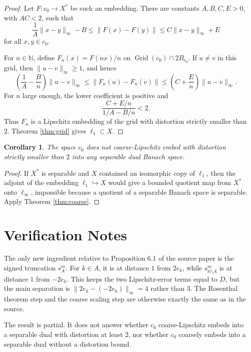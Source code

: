 \documentclass[11pt]{article}
\newtheorem{corollary}{Corollary}
\newcommand{\N}{\mathbb N}
\newcommand{\Grid}{\operatorname{Grid}}
\begin{document}
\begin{proof}
Let \(F:c_0\to X^*\) be such an embedding.  There are constants
\(A,B,C,E>0\), with \(AC<2\), such that
\[
  \frac1A\|x-y\|_\infty-B
  \le \|F(x)-F(y)\|
  \le C\|x-y\|_\infty+E
\]
for all \(x,y\in c_0\).

For \(n\in\N\), define \(F_n(x)=F(nx)/n\) on
\(\Grid(c_0)\cap 2B_{c_0}\).  If \(u\ne v\) in this grid, then
\(\|u-v\|_\infty\ge 1\), and hence
\[
  \left(\frac1A-\frac{B}{n}\right)\|u-v\|_\infty
  \le \|F_n(u)-F_n(v)\|
  \le \left(C+\frac{E}{n}\right)\|u-v\|_\infty .
\]
For \(n\) large enough, the lower coefficient is positive and
\[
  \frac{C+E/n}{1/A-B/n}<2.
\]
Thus \(F_n\) is a Lipschitz embedding of the grid with distortion strictly
smaller than \(2\).  Theorem \ref{thm:grid} gives \(\ell_1\subset X\).
\end{proof}

\begin{corollary}
The space \(c_0\) does not coarse-Lipschitz embed with distortion strictly
smaller than \(2\) into any separable dual Banach space.
\end{corollary}

\begin{proof}
If \(X^*\) is separable and \(X\) contained an isomorphic copy of \(\ell_1\),
then the adjoint of the embedding \(\ell_1\hookrightarrow X\) would give a
bounded quotient map from \(X^*\) onto \(\ell_\infty\), impossible because a
quotient of a separable Banach space is separable.  Apply Theorem
\ref{thm:coarse}.
\end{proof}

\section*{Verification Notes}

The only new ingredient relative to Proposition 6.1 of the source paper is
the signed truncation \(s_A^m\).  For \(k\in A\), it is at distance \(1\) from
\(2e_k\), while \(s_{\N\setminus A}^m\) is at distance \(1\) from \(-2e_k\).
This keeps the two Lipschitz-error terms equal to \(D\), but the main
separation is \(\|2e_k-(-2e_k)\|_\infty=4\) rather than \(3\).  The
Rosenthal theorem step and the coarse scaling step are otherwise exactly the
same as in the source.

The result is partial.  It does not answer whether \(c_0\) coarse-Lipschitz
embeds into a separable dual with distortion at least \(2\), nor whether
\(c_0\) coarsely embeds into a separable dual without a distortion bound.
\end{document}
